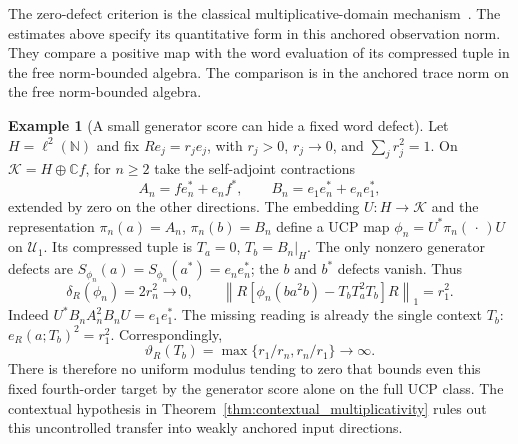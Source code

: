 \documentclass[11pt,a4paper]{amsart}
\numberwithin{equation}{section}
\theoremstyle{definition}
\newtheorem{example}[theorem]{Example}
\theoremstyle{remark}
\newcommand{\C}{\mathbb C}
\newcommand{\N}{\mathbb N}
\newcommand{\norm}[1]{\left\lVert#1\right\rVert}
\begin{document}
The zero-defect criterion is the classical multiplicative-domain mechanism~\cite{Choi,CJK}. The estimates above specify its quantitative form in this anchored observation norm. They compare a positive map with the word evaluation of its compressed tuple in the free norm-bounded algebra. The comparison is in the anchored trace norm on the free norm-bounded algebra.

\begin{example}[A small generator score can hide a fixed word defect]\label{ex:anchored_defect_instability}
Let $H=\ell^2(\N)$ and fix $Re_j=r_je_j$, with $r_j>0$, $r_j\to0$, and $\sum_jr_j^2=1$. On $\mathcal K=H\oplus\C f$, for $n\ge2$ take the self-adjoint contractions
\[
 A_n=fe_n^*+e_nf^*,\qquad
 B_n=e_1e_n^*+e_ne_1^*,
\]
extended by zero on the other directions. The embedding $U:H\to\mathcal K$ and the representation $\pi_n(a)=A_n$, $\pi_n(b)=B_n$ define a UCP map $\phi_n=U^*\pi_n(\,\cdot\,)U$ on $\mathcal U_1$. Its compressed tuple is $T_a=0$, $T_b=B_n|_H$. The only nonzero generator defects are
$S_{\phi_n}(a)=S_{\phi_n}(a^*)=e_ne_n^*$; the $b$ and $b^*$ defects vanish. Thus
\begin{equation}\label{eq:anchored_small_score_counterexample}
 \delta_R(\phi_n)=2r_n^2\longrightarrow0,
 \qquad
 \norm{R[\phi_n(ba^2b)-T_bT_a^2T_b]R}_1=r_1^2.
\end{equation}
Indeed $U^*B_nA_n^2B_nU=e_1e_1^*$. The missing reading is already the single context $T_b$:
$e_R(a;T_b)^2=r_1^2$. Correspondingly,
\[
 \vartheta_R(T_b)=\max\{r_1/r_n,r_n/r_1\}\longrightarrow\infty.
\]
There is therefore no uniform modulus tending to zero that bounds even this fixed fourth-order target by the generator score alone on the full UCP class. The contextual hypothesis in Theorem~\ref{thm:contextual_multiplicativity} rules out this uncontrolled transfer into weakly anchored input directions.
\end{example}
\end{document}

